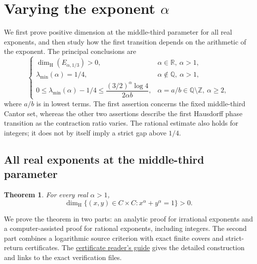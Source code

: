 \documentclass[11pt,a4paper]{amsart}
\numberwithin{equation}{section}
\newtheorem{theorem}{Theorem}[section]
\theoremstyle{definition}
\begin{document}
\section{Varying the exponent \texorpdfstring{\(\alpha\)}{alpha}}\label{sec:first}

We first prove positive dimension at the middle-third parameter for
all real exponents, and then study how the first transition depends
on the arithmetic of the exponent. The principal conclusions are
\[
\begin{cases}
\dim_{\mathrm H}(E_{\alpha,1/3})>0,
  & \alpha\in\mathbb R,\ \alpha>1,\\[4pt]
\lambda_{\min}(\alpha)=1/4,
  & \alpha\notin\mathbb Q,\ \alpha>1,\\[4pt]
0\leq\lambda_{\min}(\alpha)-1/4
  \leq\dfrac{(3/2)^\alpha\log4}{2\alpha b},
  & \alpha=a/b\in\mathbb Q\setminus\mathbb Z,\ \alpha\geq2,
\end{cases}
\]
where \(a/b\) is in lowest terms. The first assertion concerns the fixed
middle-third Cantor set, whereas the other two assertions describe the first
Hausdorff phase transition as the contraction ratio varies. The rational
estimate also holds for integers; it does not by itself imply a strict
gap above \(1/4\).

\subsection{All real exponents at the middle-third parameter}\label{subsec:classical}

\begin{theorem}\label{thm:integer-powers}\label{thm:real-powers}
For every real \(\alpha>1\),
\[
\dim_{\mathrm H}\{(x,y)\in C\times C:x^\alpha+y^\alpha=1\}>0.
\]
\end{theorem}
We prove the theorem in two parts: an analytic proof for irrational
exponents and a computer-assisted proof for rational exponents, including
integers. The second part combines a logarithmic source criterion with
exact finite covers and strict-return certificates.
The \href{https://github.com/Nero-17/LEAN-Formalisation-solutions-of-fermat-cantor-equation/blob/9ec893bcef7a71504234be897a16949c0a1f8313/docs/certificate-guide.pdf}{certificate reader's guide}
gives the detailed construction and links to the exact verification files.
\end{document}
